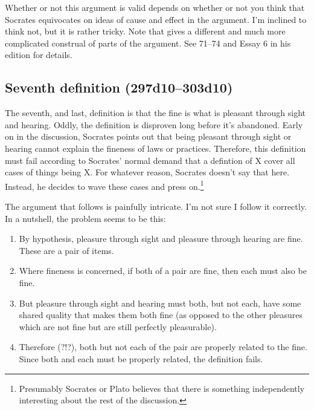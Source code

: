\documentclass[11pt]{article}
\begin{document}
Whether or not this argument is valid depends on whether or not you think
that Socrates equivocates on ideas of cause and effect in the argument.
I'm inclined to think not, but it is rather tricky.  Note that
\citet{woodruff1982} gives a different and much more complicated construal
of parts of the argument.  See 71--74 and Essay {6} in his edition for
details.


\subsection{Seventh definition (297d10--303d10)}

The seventh, and last, definition is that the fine is what is pleasant
through sight and hearing.  Oddly, the definition is disproven long before
it's abandoned.  Early on in the discussion, Socrates points out that being
pleasant through sight or hearing cannot explain the fineness of laws or
practices.  Therefore, this definition must fail according to Socrates'
normal demand that a defintion of X cover all cases of things being X.  For
whatever reason, Socrates doesn't say that here.  Instead, he decides to
wave these cases and press on.\footnote{Presumably Socrates or Plato
believes that there is something independently interesting about the rest
of the discussion.}

The argument that follows is painfully intricate.  I'm not sure I follow it
correctly.  In a nutshell, the problem seems to be this:

\begin{enumerate}

    \item By hypothesis, pleasure through sight and pleasure through
        hearing are fine.  These are a pair of items.

    \item Where fineness is concerned, if both of a pair are fine, then
        each must also be fine.

    \item But pleasure through sight and hearing must both, but not each,
        have some shared quality that makes them both fine (as opposed to
        the other pleasures which are not fine but are still perfectly
        pleasurable).

    \item Therefore (?!?), both but not each of the pair are properly
        related to the fine.  Since both and each must be properly related,
        the definition fails.

\end{enumerate}
\end{document}

